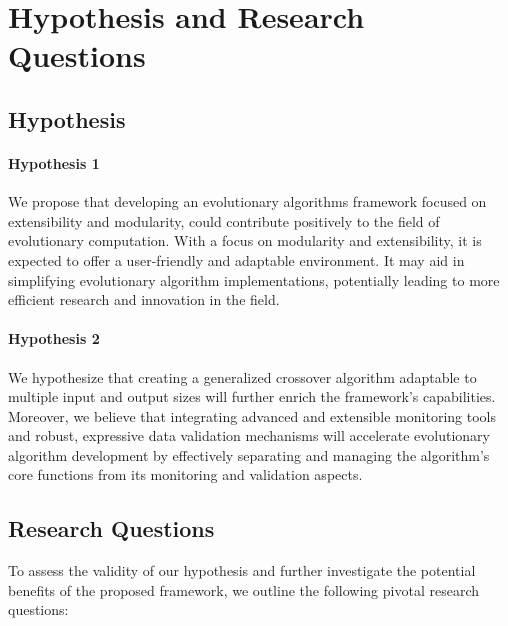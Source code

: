 \section{Hypothesis and Research Questions}
\label{sec:hyphotesis_and_research_questions}
    \subsection{Hypothesis}
        \paragraph{Hypothesis 1} 
            We propose that developing an evolutionary algorithms framework focused on extensibility and modularity, 
            could contribute positively to the field of evolutionary computation. With a focus on modularity and 
            extensibility, it is expected to offer a user-friendly and adaptable environment. It may aid in simplifying 
            evolutionary algorithm implementations, potentially leading to more efficient research and innovation in 
            the field.

        \paragraph{Hypothesis 2}
            We hypothesize that creating a generalized crossover algorithm adaptable to multiple input and output 
            sizes will further enrich the framework's capabilities. Moreover, we believe that integrating advanced and 
            extensible monitoring tools and robust, expressive data validation mechanisms will accelerate evolutionary 
            algorithm development by effectively separating and managing the algorithm's core functions from its 
            monitoring and validation aspects.

    \subsection{Research Questions}
        To assess the validity of our hypothesis and further investigate the potential benefits of the proposed 
        framework, we outline the following pivotal research questions:

